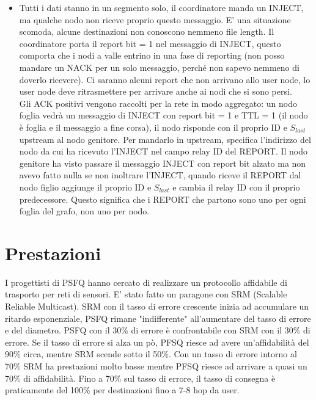 \documentclass[12pt,italian]{report}
\begin{document}
\begin{itemize}
    \item Tutti i dati stanno in un segmento solo, il coordinatore manda un INJECT, ma qualche nodo non riceve proprio questo messaggio. E' una situazione scomoda, alcune destinazioni non conoscono nemmeno file length. Il coordinatore porta il report bit = 1 nel messaggio di INJECT, questo comporta che i nodi a valle entrino in una fase di reporting (non posso mandare un NACK per un solo messaggio, perché non sapevo nemmeno di doverlo ricevere). Ci saranno alcuni report che non arrivano allo user node, lo user node deve ritrasmettere per arrivare anche ai nodi che si sono persi. \\ Gli ACK positivi vengono raccolti per la rete in modo aggregato: un nodo foglia vedrà un messaggio di INJECT con report bit = 1 e TTL = 1 (il nodo è foglia e il messaggio a fine corsa), il nodo risponde con il proprio ID e $S_{last}$ upstream al nodo genitore. Per mandarlo in upstream, specifica l'indirizzo del nodo da cui ha ricevuto l'INJECT nel campo relay ID del REPORT. Il nodo genitore ha visto passare il messaggio INJECT con report bit alzato ma non avevo fatto nulla se non inoltrare l'INJECT, quando riceve il REPORT dal nodo figlio aggiunge il proprio ID e $S_{last}$ e cambia il relay ID con il proprio predecessore. Questo significa che i REPORT che partono sono uno per ogni foglia del grafo, non uno per nodo. 
\end{itemize} 

\section{Prestazioni}
I progettisti di PSFQ hanno cercato di realizzare un protocollo affidabile di trasporto per reti di sensori. 
\bigbreak
E' stato fatto un paragone con SRM (Scalable Reliable Multicast). SRM con il tasso di errore crescente inizia ad accumulare un ritardo esponenziale, PSFQ rimane "indifferente" all'aumentare del tasso di errore e del diametro. 
\bigbreak
PSFQ con il 30\% di errore è confrontabile con SRM con il 30\% di errore. Se il tasso di errore si alza un pò, PFSQ riesce ad avere un'affidabilità del 90\% circa, mentre SRM scende sotto il 50\%. Con un tasso di errore intorno al 70\% SRM ha prestazioni molto basse mentre PFSQ riesce ad arrivare a quasi un 70\% di affidabilità. 
\bigbreak
Fino a 70\% sul tasso di errore, il tasso di consegna è praticamente del 100\% per destinazioni fino a 7-8 hop da user. 
\end{document}
